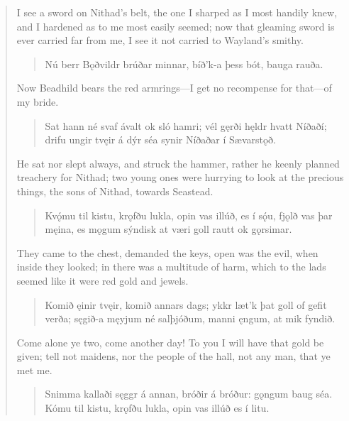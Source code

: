 \begin{verse}
\bvb I see a sword on Nithad’s belt, the one I sharped as I most handily knew, and I hardened as to me most easily seemed; now that gleaming sword is ever carried far from me, I see it not carried to Wayland’s smithy.

\begin{verse}
\bva Nú berr Bǫðvildr \hld brúðar minnar,
bíð’k-a þess bót, \hld bauga rauða. \\%
\end{verse}

\bvb Now Beadhild bears the red armrings—I get no recompense for that—of my bride.

\begin{verse}
\bva Sat hann né svaf ávalt \hld ok sló hamri;
vél gęrði hęldr \hld hvatt Níðaðí;
drifu ungir tvęir \hld á dýr séa
synir Níðaðar \hld í Sævarstǫð. \\%
\end{verse}

\bvb He sat nor slept always, and struck the hammer, rather he keenly planned treachery for Nithad; two young ones were hurrying to look at the precious things, the sons of Nithad, towards Seastead.

\begin{verse}
\bva Kvǫ́mu til kistu, \hld krǫfðu lukla,
opin vas illúð, \hld es í sǫ́u,
fjǫlð vas þar męina, \hld es mǫgum sýndisk
at væri goll rautt \hld ok gǫrsimar. \\%
\end{verse}

\bvb They came to the chest, demanded the keys, open was the evil, when inside they looked; in there was a multitude of harm, which to the lads seemed like it were red gold and jewels.

\begin{verse}
\bva Komið ęinir tvęir, \hld komið annars dags;
ykkr læt’k þat goll \hld of gefit verða;
sęgið-a męyjum \hld né salþjóðum,
manni ęngum, \hld at mik fyndið. \\%
\end{verse}

\bvb Come alone ye two, come another day! To you I will have that gold be given; tell not maidens, nor the people of the hall, not any man, that ye met me.

\begin{verse}
\bva Snimma kallaði \hld sęggr á annan,
bróðir á bróður: \hld gǫngum baug séa.
Kómu til kistu, \hld krǫfðu lukla,
opin vas illúð \hld es í litu. \\%
\end{verse}


\end{verse}
